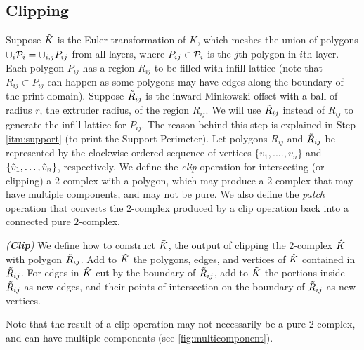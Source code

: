 %
\subsection{Clipping}\label{subsec:clipping}
Suppose $\hat{K}$ is the Euler transformation of $K$, which meshes the union of polygons $\displaystyle \cup_i \mathcal{P}_i = \cup_{i,j} P_{ij}$ from all layers, where $P_{ij} \in \mathcal{P}_i$ is the $j$th polygon in $i$th layer.
Each polygon $P_{ij}$ has a region $R_{ij}$ to be filled with infill lattice (note that $R_{ij} \subset P_{ij}$ can happen as some polygons may have edges along the boundary of the print domain).
Suppose $\tilde{R}_{ij}$ is the inward Minkowski offset with a ball of radius $r$, the extruder radius, of the region $R_{ij}$.
We will use $\tilde{R}_{ij}$ instead of $R_{ij}$ to generate the infill lattice for $P_{ij}$.
The reason behind this step is explained in Step \ref{itm:support} (to print the Support Perimeter).
Let polygons $R_{ij}$ and $\tilde{R}_{ij}$ be represented by the clockwise-ordered sequence of vertices $\{v_1, .... , v_n\}$ and $\{\tilde{v}_1, \dots , \tilde{v}_n\}$, respectively.
We define the \emph{clip} operation for intersecting (or clipping) a $2$-complex with a polygon, which may produce a $2$-complex that may have multiple components, and may not be pure.
We also define the \emph{patch} operation that converts the $2$-complex produced by a clip operation back into a connected pure $2$-complex.


\begin{defn} \label{def:clip}
  \emph{({\bfseries Clip})}
  We define how to construct $\tilde{K}$, the output of clipping the $2$-complex $\hat{K}$ with polygon $\tilde{R}_{ij}$.
  Add  to $\tilde{K}$ the polygons, edges, and vertices of $\hat{K}$ contained in $\tilde{R}_{ij}$.
  For edges in $\hat{K}$ cut by the boundary of $\tilde{R}_{ij}$, add to $\tilde{K}$ the portions inside $\tilde{R}_{ij}$ as new edges, and their points of intersection on the boundary of $\tilde{R}_{ij}$ as new vertices.
\end{defn}
%
Note that the result of a clip operation may not necessarily be a pure $2$-complex, and can have multiple components (see \cref{fig:multicomponent}).

